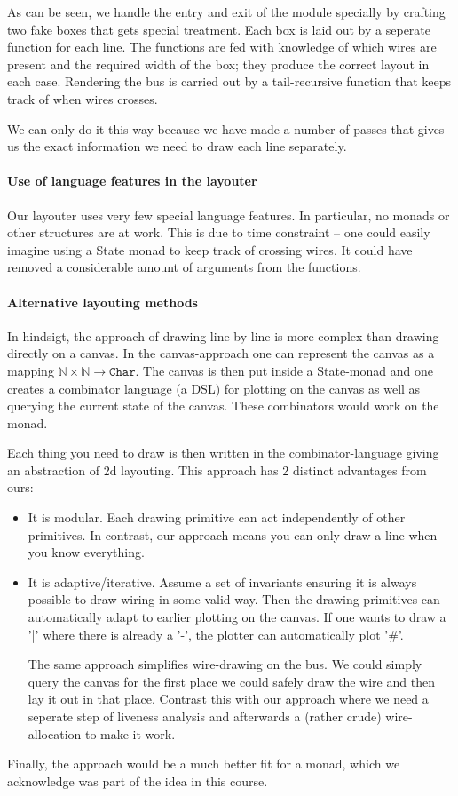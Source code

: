 As can be seen, we handle the entry and exit of the module specially
by crafting two fake boxes that gets special treatment. Each box is
laid out by a seperate function for each line. The functions are fed
with knowledge of which wires are present and the required width of
the box; they produce the correct layout in each case. Rendering the
bus is carried out by a tail-recursive function that keeps track of
when wires crosses.

We can only do it this way because we have made a number of passes
that gives us the exact information we need to draw each line
separately.

\paragraph{Use of language features in the layouter}
\label{sec:use-lang-feat}

Our layouter uses very few special language features. In particular,
no monads or other structures are at work. This is due to time
constraint -- one could easily imagine using a State monad to keep
track of crossing wires. It could have removed a considerable amount
of arguments from the functions.

\paragraph{Alternative layouting methods}
\label{sec:altern-layo-meth}

In hindsigt, the approach of drawing line-by-line is more complex than
drawing directly on a canvas. In the canvas-approach one can represent
the canvas as a mapping $\mathbb{N} \times \mathbb{N} \to
\texttt{Char}$. The canvas is then put inside a State-monad and one
creates a combinator language (a DSL) for plotting on the canvas as
well as querying the current state of the canvas. These combinators
would work on the monad.

Each thing you need to draw is then written in the combinator-language
giving an abstraction of 2d layouting. This approach has 2 distinct
advantages from ours:
\begin{itemize}
\item It is modular. Each drawing primitive can act independently of
  other primitives. In contrast, our approach means you can only draw
  a line when you know everything.
\item It is adaptive/iterative. Assume a set of invariants
  ensuring it is always possible to draw wiring in some valid
  way. Then the drawing primitives can automatically adapt to earlier
  plotting on the canvas. If one wants to draw a '|' where there is
  already a '-', the plotter can automatically plot '\#'.

  The same approach simplifies wire-drawing on the bus. We could
  simply query the canvas for the first place we could safely draw the
  wire and then lay it out in that place. Contrast this with our
  approach where we need a seperate step of liveness analysis and
  afterwards a (rather crude) wire-allocation to make it work.
\end{itemize}
Finally, the approach would be a much better fit for a monad, which we
acknowledge was part of the idea in this course.


